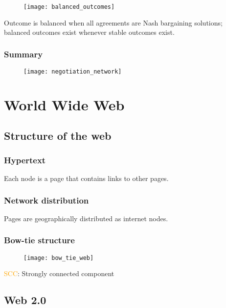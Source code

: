 \begin{figure}[H]
    \centering
    \texttt{[image: balanced\_outcomes]}
\end{figure}

Outcome is balanced when all agreements are Nash bargaining solutions; balanced outcomes exist whenever stable outcomes exist.

\subsection{Summary}

\begin{figure}[H]
    \centering
    \texttt{[image: negotiation\_network]}
\end{figure}

\chapter{World Wide Web}

\section{Structure of the web}

\subsection{Hypertext}

Each node is a page that contains links to other pages.

\subsection{Network distribution}

Pages are geographically distributed as internet nodes.

\subsection{Bow-tie structure}

\begin{figure}[H]
    \centering
    \texttt{[image: bow\_tie\_web]}
\end{figure}

\textcolor{orange}{SCC}: Strongly connected component

\section{Web 2.0}

